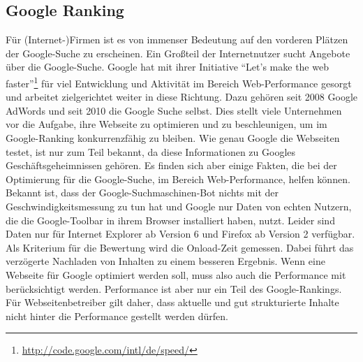 \subsection{Google Ranking}
Für (Internet-)Firmen ist es von immenser Bedeutung auf den vorderen Pl\"atzen der Google-Suche zu erscheinen. Ein Großteil der Internetnutzer sucht Angebote über die Google-Suche.\citep{Hitwise2011}
Google hat mit ihrer Initiative "`Let's make the web faster"'\footnote{\url{http://code.google.com/intl/de/speed/}} für viel Entwicklung und Aktivität im Bereich Web-Performance gesorgt und arbeitet zielgerichtet weiter in diese Richtung.\citep{Google2011} Dazu gehören seit 2008 Google AdWords\citep{AdWords2008} und seit 2010 die Google Suche selbst. Dies stellt viele Unternehmen vor die Aufgabe, ihre Webseite zu optimieren und zu beschleunigen, um im Google-Ranking konkurrenzfähig zu bleiben. Wie genau Google die Webseiten testet, ist nur zum Teil bekannt, da diese Informationen zu Googles Geschäftsgeheimnissen gehören. Es finden sich aber einige Fakten, die bei der Optimierung für die Google-Suche, im Bereich Web-Performance, helfen können.
Bekannt ist, dass der Google-Suchmaschinen-Bot nichts mit der Geschwindigkeitsmessung zu tun hat und Google nur Daten von echten Nutzern, die die Google-Toolbar in ihrem Browser installiert haben, nutzt. Leider sind Daten nur für Internet Explorer ab Version 6 und Firefox ab Version 2 verfügbar. Als Kriterium für die Bewertung wird die Onload-Zeit gemessen. Dabei führt das verzögerte Nachladen von Inhalten zu einem besseren Ergebnis. Wenn eine Webseite für Google optimiert werden soll, muss also auch die Performance mit berücksichtigt werden. Performance ist aber nur ein Teil des Google-Rankings. Für Webseitenbetreiber gilt daher, dass aktuelle und gut strukturierte Inhalte nicht hinter die Performance gestellt werden dürfen.\citep{Bixby2011}

